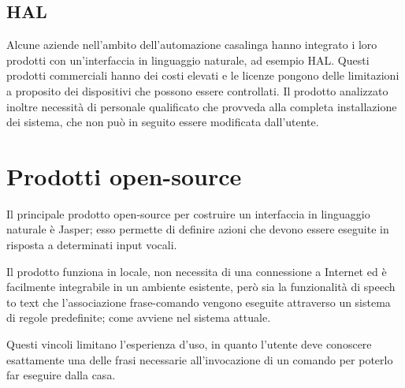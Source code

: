 \documentclass[twoside]{supsistudent}
\begin{document}
\subsection{HAL}
Alcune aziende nell'ambito dell'automazione casalinga hanno integrato i loro prodotti con un'interfaccia in linguaggio naturale, ad esempio HAL. Questi prodotti commerciali hanno dei costi elevati e le licenze pongono delle limitazioni a proposito dei dispositivi che possono essere controllati. Il prodotto analizzato inoltre necessità di personale qualificato che provveda alla completa installazione dei sistema, che non può in seguito essere modificata dall'utente.\cite{HAL}

\section{Prodotti open-source}
Il principale prodotto open-source per costruire un interfaccia in linguaggio naturale è Jasper; esso permette di definire azioni che devono essere eseguite in risposta a determinati input vocali. \cite{jasper}

Il prodotto funziona in locale, non necessita di una connessione a Internet ed è facilmente integrabile in un ambiente esistente, però sia la funzionalità di speech to text che l'associazione frase-comando vengono eseguite attraverso un sistema di regole predefinite; come avviene nel sistema attuale.

Questi vincoli limitano l'esperienza d'uso, in quanto l'utente deve conoscere esattamente una delle frasi necessarie all'invocazione di un comando per poterlo far eseguire dalla casa.
\end{document}
